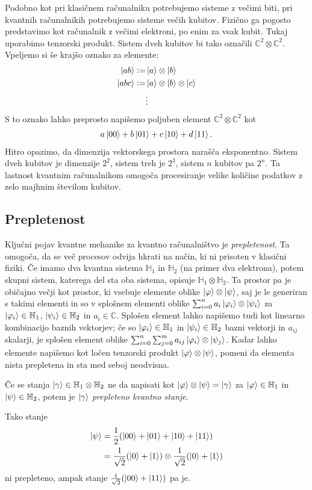\documentclass[mat1]{fmfdelo}
\newcommand{\C}{\mathbb C}
\newcommand{\Hb}{\mathbb H}
\renewcommand{\phi}{\varphi}
\newcommand{\defeq}{\vcentcolon=}
\begin{document}
Podobno kot pri klasičnem računalniku potrebujemo sisteme z večimi biti, pri kvantnih računalnikih potrebujemo sisteme večih kubitov. Fizično ga pogosto predstavimo kot računalnik z večimi elektroni, po enim za vsak kubit. Tukaj uporabimo tenzorski produkt. Sistem dveh kubitov bi tako označili \(\mathbb C^2 \otimes \mathbb C^2\). Vpeljemo si še krajšo oznako za elemente:
\begin{align*}
    \ket{ab} \defeq& \ket{a}\otimes\ket{b}\\
    \ket{abc} \defeq& \ket{a}\otimes\ket{b}\otimes\ket{c}\\
    &\vdots
\end{align*}
S to oznako lahko preprosto napišemo poljuben element \(\mathbb C^2 \otimes \mathbb C^2\) kot
\begin{align*}
    a\ket{00} + b\ket{01} + c\ket{10} + d\ket{11}.
\end{align*}
Hitro opazimo, da dimenzija vektorskega prostora narašča eksponentno. Sistem dveh kubitov je dimenzije \(2^2\), sistem treh je \(2^3\), sistem \(n\) kubitov pa \(2^n\). Ta lastnost kvantnim računalnikom omogoča procesiranje velike količine podatkov z zelo majhnim številom kubitov.
\subsection{Prepletenost}
Ključni pojav kvantne mehanike za kvantno računalništvo je \emph{prepletenost}. Ta omogoča, da se več procesov odvija hkrati na način, ki ni prisoten v klasični fiziki. Če imamo dva kvantna sistema \(\Hb_1\) in \(\Hb_2\) (na primer dva elektrona), potem skupni sistem, katerega del sta oba sistema, opisuje \(\Hb_1\otimes\Hb_2\). Ta prostor pa je običajno večji kot prostor, ki vsebuje elemente oblike \(\ket\varphi\otimes\ket\psi\), saj je le generiran s takimi elementi in so v splošnem elementi oblike \(\sum_{i=0}^n a_i\ket{\varphi_i}\otimes\ket{\psi_i}\) za \(\ket{\phi_i}\in\Hb_1\), \(\ket{\psi_i}\in \Hb_2\) in \(a_i\in \C\). Splošen element lahko napišemo tudi kot linearno kombinacijo baznih vektorjev; če so \(\ket{\phi_i}\in \Hb_1\) in \(\ket{\psi_i}\in\Hb_2\) bazni vektorji in \(a_{ij}\) skalarji, je splošen element oblike \(\sum_{i=0}^n\sum_{j=0}^m a_{ij}\ket{\phi_i}\otimes\ket{\psi_j}\). Kadar lahko elemente napišemo kot ločen tenzorski produkt \(\ket\varphi\otimes\ket\psi\), pomeni da elementa nista prepletena in sta med seboj neodvisna.
\begin{definicija}
    Če se stanja \(\ket\gamma\in \Hb_1\otimes\Hb_2\) ne da napisati kot \(\ket\varphi\otimes\ket\psi = \ket\gamma\) za \(\ket\varphi\in\Hb_1\) in \(\ket\psi\in\Hb_2\), potem je \(\ket\gamma\) \emph{prepleteno kvantno stanje}.
\end{definicija}
Tako stanje
\begin{align*}
    \ket\psi &=  \frac12(\ket{00}+\ket{01}+\ket{10}+\ket{11})\\
    &= \frac{1}{\sqrt2}(\ket0+\ket1) \otimes \frac{1}{\sqrt2}(\ket0+\ket1) 
\end{align*}
ni prepleteno, ampak stanje \(\frac{1}{\sqrt2}(\ket{00}+\ket{11})\) pa je.
\end{document}
